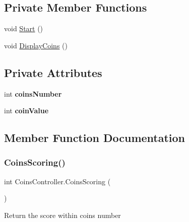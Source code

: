 \subsection*{Private Member Functions}
\begin{DoxyCompactItemize}
\item 
void \mbox{\hyperlink{class_coins_controller_a66e8e82f7c8252eb269ac33c14f64ff4}{Start}} ()
\item 
void \mbox{\hyperlink{class_coins_controller_a0ede17e1bf12716f77e4d1aefa9ba40a}{Display\+Coins}} ()
\end{DoxyCompactItemize}
\subsection*{Private Attributes}
\begin{DoxyCompactItemize}
\item 
\mbox{\label{class_coins_controller_a8289727f48a3d1e5fc8f8221d116ee1c}} 
int {\bfseries coins\+Number}
\item 
\mbox{\label{class_coins_controller_a9dfd46809685505826d7209c1ef5047f}} 
int {\bfseries coin\+Value}
\end{DoxyCompactItemize}


\subsection{Member Function Documentation}
\mbox{\label{class_coins_controller_ad2dfabb2b5d8a596964e642709617833}} 
\subsubsection{\texorpdfstring{Coins\+Scoring()}{CoinsScoring()}}
{\footnotesize\ttfamily int Coins\+Controller.\+Coins\+Scoring (\begin{DoxyParamCaption}{ }\end{DoxyParamCaption})}

Return the score within coins number \mbox{\label{class_coins_controller_a9c72eb14a73df2248a45b520cc05f0af}} 
